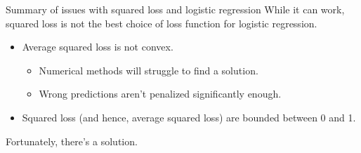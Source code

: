 \documentclass[aspectratio=169]{../latex_main/tntbeamer}  %
\begin{document}
	\begin{frame}{Summary of issues with squared loss and logistic regression}
	    While it can work, squared loss is not the best choice of loss function for logistic regression.
	    \begin{itemize}
	        \item Average squared loss is not convex.
	        \begin{itemize}
	            \item Numerical methods will struggle to find a solution.
	        \end{itemize}
	        \begin{itemize}
	            \item Wrong predictions aren’t penalized significantly enough.
	        \end{itemize}
	        \item Squared loss (and hence, average squared loss) are bounded between 0 and 1.
	    \end{itemize}
	    
	    \bigskip
	    Fortunately, there’s a solution.
	\end{frame}
\end{document}
